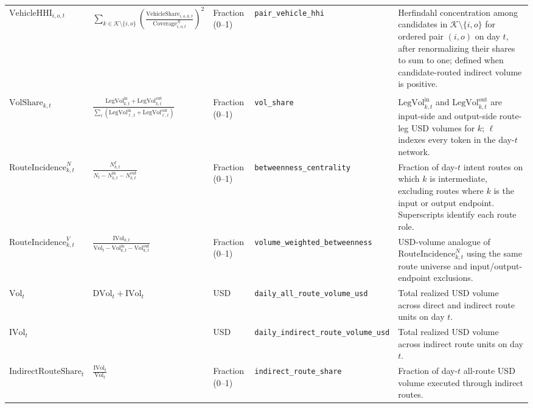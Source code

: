 \begin{tabularx}{\linewidth}{@{}>{\raggedright\arraybackslash}X>{\raggedright\arraybackslash}Xl>{\raggedright\arraybackslash}X>{\raggedright\arraybackslash}X@{}}
$\mathrm{VehicleHHI}_{i,o,t}$ & $\displaystyle\sum_{k\in\mathcal K\setminus\{i,o\}}\left(\frac{\mathrm{VehicleShare}_{i,o,k,t}}{\mathrm{Coverage}^{\mathcal K}_{i,o,t}}\right)^2$ & Fraction (0--1) & \texttt{pair\_\allowbreak{}vehicle\_\allowbreak{}hhi} & Herfindahl concentration among candidates in $\mathcal K\setminus\{i,o\}$ for ordered pair $(i,o)$ on day $t$, after renormalizing their shares to sum to one; defined when candidate-routed indirect volume is positive. \\
\addlinespace
\multicolumn{5}{@{}l}{\textit{Network and route-denominator controls}} \\
$\mathrm{VolShare}_{k,t}$ & $\displaystyle\frac{\mathrm{LegVol}^{\mathrm{in}}_{k,t}+\mathrm{LegVol}^{\mathrm{out}}_{k,t}}{\sum_{\ell}(\mathrm{LegVol}^{\mathrm{in}}_{\ell,t}+\mathrm{LegVol}^{\mathrm{out}}_{\ell,t})}$ & Fraction (0--1) & \texttt{vol\_\allowbreak{}share} & $\mathrm{LegVol}^{\mathrm{in}}_{k,t}$ and $\mathrm{LegVol}^{\mathrm{out}}_{k,t}$ are input-side and output-side route-leg USD volumes for $k$; $\ell$ indexes every token in the day-$t$ network. \\
$\mathrm{RouteIncidence}^{N}_{k,t}$ & $\displaystyle\frac{N^{I}_{k,t}}{N_t-N^{\mathrm{in}}_{k,t}-N^{\mathrm{out}}_{k,t}}$ & Fraction (0--1) & \texttt{betweenness\_\allowbreak{}centrality} & Fraction of day-$t$ intent routes on which $k$ is intermediate, excluding routes where $k$ is the input or output endpoint. Superscripts identify each route role. \\
$\mathrm{RouteIncidence}^{V}_{k,t}$ & $\displaystyle\frac{\mathrm{IVol}_{k,t}}{\mathrm{Vol}_t-\mathrm{Vol}^{\mathrm{in}}_{k,t}-\mathrm{Vol}^{\mathrm{out}}_{k,t}}$ & Fraction (0--1) & \texttt{volume\_\allowbreak{}weighted\_\allowbreak{}betweenness} & USD-volume analogue of $\mathrm{RouteIncidence}^{N}_{k,t}$ using the same route universe and input/output-endpoint exclusions. \\
$\mathrm{Vol}_t$ & $\mathrm{DVol}_t+\mathrm{IVol}_t$ & USD & \texttt{daily\_\allowbreak{}all\_\allowbreak{}route\_\allowbreak{}volume\_\allowbreak{}usd} & Total realized USD volume across direct and indirect route units on day $t$. \\
$\mathrm{IVol}_t$ &  & USD & \texttt{daily\_\allowbreak{}indirect\_\allowbreak{}route\_\allowbreak{}volume\_\allowbreak{}usd} & Total realized USD volume across indirect route units on day $t$. \\
$\mathrm{IndirectRouteShare}_{t}$ & $\displaystyle\frac{\mathrm{IVol}_t}{\mathrm{Vol}_t}$ & Fraction (0--1) & \texttt{indirect\_\allowbreak{}route\_\allowbreak{}share} & Fraction of day-$t$ all-route USD volume executed through indirect routes. \\

\end{tabularx}
